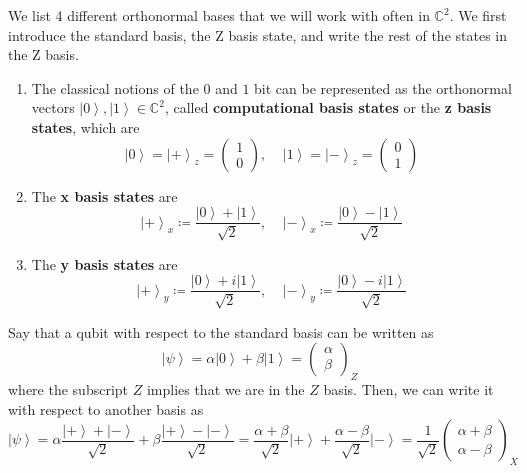 \documentclass{article}
\newcommand{\ket}[1]{\ensuremath{\left|#1\right\rangle}}
\begin{document}
    \begin{definition}
      We list 4 different orthonormal bases that we will work with often in $\mathbb{C}^2$. We first introduce the standard basis, the Z basis state, and write the rest of the states in the Z basis. 

      \begin{enumerate}
        \item The classical notions of the $0$ and $1$ bit can be represented as the orthonormal vectors $\ket{0}, \ket{1} \in \mathbb{C}^2$, called \textbf{computational basis states} or the \textbf{z basis states}, which are
          \[\ket{0} = \ket{+}_z = \begin{pmatrix} 1 \\ 0 \end{pmatrix}, \;\;\;\; \ket{1} = \ket{-}_z = \begin{pmatrix} 0 \\ 1 \end{pmatrix}\]  

        \item The \textbf{x basis states} are 
          \begin{equation}
            \ket{+}_x \coloneqq \frac{\ket{0} + \ket{1}}{\sqrt{2}} , \;\;\;\; \ket{-}_x \coloneqq \frac{\ket{0} - \ket{1}}{\sqrt{2}} 
            \label{eq:x_basis}
          \end{equation}
        
        \item The \textbf{y basis states} are 
          \begin{equation}
            \ket{+}_y \coloneqq \frac{\ket{0} + i \ket{1}}{\sqrt{2}} , \;\;\;\; \ket{-}_y \coloneqq \frac{\ket{0} - i \ket{1}}{\sqrt{2}} 
            \label{eq:y_basis}
          \end{equation}
      \end{enumerate}      
    \end{definition}

    \begin{example} 
      Say that a qubit with respect to the standard basis can be written as 
      \begin{equation}
        \ket{\psi} = \alpha \ket{0} + \beta \ket{1} = \begin{pmatrix} \alpha \\ \beta \end{pmatrix}_Z 
      \end{equation}
      where the subscript $Z$ implies that we are in the $Z$ basis. Then, we can write it with respect to another basis as 
      \begin{equation}
        \ket{\psi} = \alpha \frac{\ket{+} + \ket{-}}{\sqrt{2}} + \beta \frac{\ket{+} - \ket{-}}{\sqrt{2}} = \frac{\alpha + \beta}{\sqrt{2}} \ket{+} + \frac{\alpha - \beta}{\sqrt{2}} \ket{-} = \frac{1}{\sqrt{2}} \begin{pmatrix} \alpha + \beta \\ \alpha - \beta \end{pmatrix}_X
      \end{equation}
    \end{example}
\end{document}
